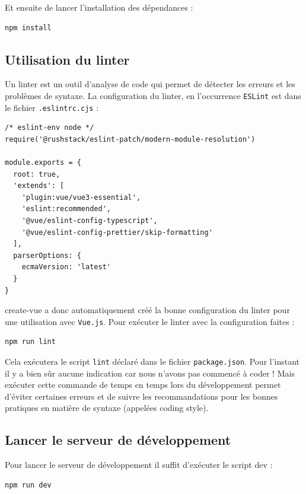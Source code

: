 \documentclass{article}
\begin{document}
Et ensuite de lancer l'installation des dépendances :
\begin{verbatim}
npm install
\end{verbatim}

\subsection{Utilisation du linter}
Un linter est un outil d'analyse de code qui permet de détecter les erreurs et les problèmes de syntaxe. La configuration du linter, en l'occurrence {\tt ESLint} est dans le fichier {\tt .eslintrc.cjs} :
\begin{verbatim}
/* eslint-env node */
require('@rushstack/eslint-patch/modern-module-resolution')

module.exports = {
  root: true,
  'extends': [
    'plugin:vue/vue3-essential',
    'eslint:recommended',
    '@vue/eslint-config-typescript',
    '@vue/eslint-config-prettier/skip-formatting'
  ],
  parserOptions: {
    ecmaVersion: 'latest'
  }
}
\end{verbatim}

{\color{monOrange} create-vue} a donc automatiquement créé la bonne configuration du linter pour une utilisation avec {\tt Vue.js}. Pour exécuter le linter avec la configuration faites :

\begin{verbatim}
npm run lint
\end{verbatim}     

Cela exécutera le script {\tt lint} déclaré dans le fichier {\tt package.json}. Pour l'instant il y a bien sûr aucune indication car nous n'avons pas commencé à coder ! Mais exécuter cette commande de temps en temps lors du développement permet d'éviter certaines erreurs et de suivre les recommandations pour les bonnes pratiques en matière de syntaxe (appelées coding style).

\subsection{Lancer le serveur de développement}
Pour lancer le serveur de développement il suffit d'exécuter le script dev :
\begin{verbatim}
npm run dev
\end{verbatim} 
\end{document}
